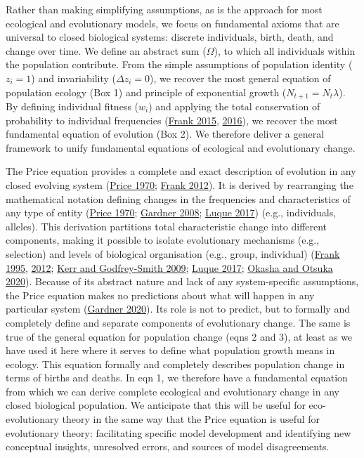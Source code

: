 \documentclass[
]{article}
\begin{document}
Rather than making simplifying assumptions, as is the approach for most
ecological and evolutionary models, we focus on fundamental axioms that
are universal to closed biological systems: discrete individuals, birth,
death, and change over time. We define an abstract sum (\(\Omega\)), to
which all individuals within the population contribute. From the simple
assumptions of population identity (\(z_{i} = 1\)) and invariability
(\(\Delta z_{i} = 0\)), we recover the most general equation of
population ecology (Box 1) and principle of exponential growth
(\(N_{t+1} = N_{t}\lambda\)). By defining individual fitness (\(w_{i}\))
and applying the total conservation of probability to individual
frequencies (\protect\hyperlink{ref-Frank2015}{Frank 2015},
\protect\hyperlink{ref-Frank2016}{2016}), we recover the most
fundamental equation of evolution (Box 2). We therefore deliver a
general framework to unify fundamental equations of ecological and
evolutionary change.

The Price equation provides a complete and exact description of
evolution in any closed evolving system
(\protect\hyperlink{ref-Price1970}{Price 1970};
\protect\hyperlink{ref-Frank2012}{Frank 2012}). It is derived by
rearranging the mathematical notation defining changes in the
frequencies and characteristics of any type of entity
(\protect\hyperlink{ref-Price1970}{Price 1970};
\protect\hyperlink{ref-Gardner2008}{Gardner 2008};
\protect\hyperlink{ref-Luque2016}{Luque 2017}) (e.g., individuals,
alleles). This derivation partitions total characteristic change into
different components, making it possible to isolate evolutionary
mechanisms (e.g., selection) and levels of biological organisation
(e.g., group, individual) (\protect\hyperlink{ref-Frank1995}{Frank
1995}, \protect\hyperlink{ref-Frank2012}{2012};
\protect\hyperlink{ref-Kerr2009}{Kerr and Godfrey-Smith 2009};
\protect\hyperlink{ref-Luque2016}{Luque 2017};
\protect\hyperlink{ref-Okasha2020}{Okasha and Otsuka 2020}). Because of
its abstract nature and lack of any system-specific assumptions, the
Price equation makes no predictions about what will happen in any
particular system (\protect\hyperlink{ref-Gardner2020}{Gardner 2020}).
Its role is not to predict, but to formally and completely define and
separate components of evolutionary change. The same is true of the
general equation for population change (eqns 2 and 3), at least as we
have used it here where it serves to define what population growth means
in ecology. This equation formally and completely describes population
change in terms of births and deaths. In eqn 1, we therefore have a
fundamental equation from which we can derive complete ecological and
evolutionary change in any closed biological population. We anticipate
that this will be useful for eco-evolutionary theory in the same way
that the Price equation is useful for evolutionary theory: facilitating
specific model development and identifying new conceptual insights,
unresolved errors, and sources of model disagreements.
\end{document}
